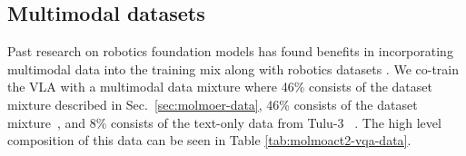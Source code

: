 \subsection{Multimodal datasets}
Past research on robotics foundation models has found benefits in incorporating multimodal data into the training mix along with robotics datasets \citep{lee2025molmoactactionreasoningmodels, intelligence2025pi05visionlanguageactionmodelopenworld}. We co-train the VLA with a multimodal data mixture where 46\% consists of the \molmoer dataset mixture described in Sec.~\ref{sec:molmoer-data}, 46\% consists of the \molmot dataset mixture~\citep{clark2026molmo2openweightsdata}, and 8\% consists of the text-only data from Tulu-3 ~\citep{lambert2025tulu3pushingfrontiers}. The high level composition of this data can be seen in Table \ref{tab:molmoact2-vqa-data}.



